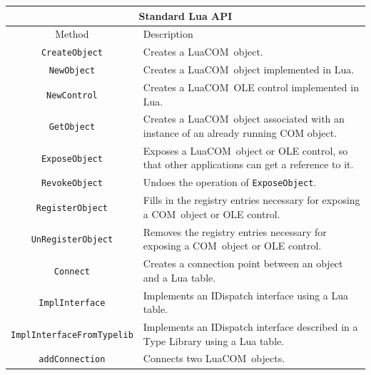\documentclass[11pt,a4paper,english]{report}
\newcommand{\ttext}[1]{#1}
\newcommand{\ttitle}[1]{#1}
\newcommand{\tlinetitB}[2]{#1 & #2 \\ \hline \hline}
\newcommand{\ttext}[1]{{\raggedright #1 \\}}
\newcommand{\ttitle}[1]{\begin{minipage}{\colA cm} \centering \bf #1 \end{minipage}}
\newcommand{\tlinetitB}[2]{\ttitle{#1} & \ttitle{#2} \\ \hline \hline}
\newcommand{\techname}[1]{\mbox{#1}}
\newcommand{\com}{\techname{COM}}
\newcommand{\luacom}{\techname{LuaCOM}}
\begin{document}
  \begin{center}
  \begin{tabular}{|c|p{7cm}|}

  \multicolumn{2}{c}{\large Standard Lua API} \\
  \hline

  \tlinetitB{Method}{Description}

  \verb+CreateObject+
    & \ttext{Creates a \luacom\ object.} \\ \hline

  \verb+NewObject+
    & \ttext{Creates a \luacom\ object implemented in Lua.} \\ \hline

  \verb+NewControl+
    & \ttext{Creates a \luacom\ OLE control implemented in Lua.} \\ \hline

  \verb+GetObject+
    & \ttext{Creates a \luacom\ object associated with an
    instance of an already running COM object.} \\ \hline

  \verb+ExposeObject+ & \ttext{Exposes a \luacom\ object or OLE control, so
    that other applications can get a reference to it.} \\ \hline

  \verb+RevokeObject+
    & \ttext{Undoes the operation of \texttt{ExposeObject}.} \\ \hline

  \verb+RegisterObject+
    & \ttext{Fills in the registry entries necessary for exposing a
    \com\ object or OLE control.} \\ \hline

  \verb+UnRegisterObject+
    & \ttext{Removes the registry entries necessary for exposing a
    \com\ object or OLE control.} \\ \hline

  \verb+Connect+
    & \ttext{Creates a connection point between an object and a Lua table.} \\ \hline

  \verb+ImplInterface+ & \ttext{Implements an IDispatch
    interface using a Lua table.} \\ \hline

  \verb+ImplInterfaceFromTypelib+ & \ttext{Implements an
    IDispatch interface described in a Type Library using a Lua table.}
    \\ \hline

  \verb+addConnection+
    & \ttext{Connects two \luacom\ objects.} \\ \hline


\end{tabular}
\end{center}
\end{document}
